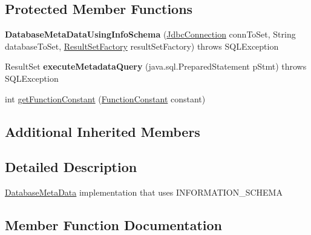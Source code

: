 \subsection*{Protected Member Functions}
\begin{DoxyCompactItemize}
\item 
\mbox{\label{classcom_1_1mysql_1_1cj_1_1jdbc_1_1_database_meta_data_using_info_schema_a0b688ba3bfda6e4e64a3c6374a977c52}} 
{\bfseries Database\+Meta\+Data\+Using\+Info\+Schema} (\mbox{\hyperlink{interfacecom_1_1mysql_1_1cj_1_1jdbc_1_1_jdbc_connection}{Jdbc\+Connection}} conn\+To\+Set, String database\+To\+Set, \mbox{\hyperlink{classcom_1_1mysql_1_1cj_1_1jdbc_1_1result_1_1_result_set_factory}{Result\+Set\+Factory}} result\+Set\+Factory)  throws S\+Q\+L\+Exception 
\item 
\mbox{\label{classcom_1_1mysql_1_1cj_1_1jdbc_1_1_database_meta_data_using_info_schema_aa18be67f7fbf345b6f5da88e68db44d2}} 
Result\+Set {\bfseries execute\+Metadata\+Query} (java.\+sql.\+Prepared\+Statement p\+Stmt)  throws S\+Q\+L\+Exception 
\item 
int \mbox{\hyperlink{classcom_1_1mysql_1_1cj_1_1jdbc_1_1_database_meta_data_using_info_schema_a3b2681238658a1ff285a88fef217016d}{get\+Function\+Constant}} (\mbox{\hyperlink{enumcom_1_1mysql_1_1cj_1_1jdbc_1_1_database_meta_data_using_info_schema_1_1_function_constant}{Function\+Constant}} constant)
\end{DoxyCompactItemize}
\subsection*{Additional Inherited Members}


\subsection{Detailed Description}
\mbox{\hyperlink{classcom_1_1mysql_1_1cj_1_1jdbc_1_1_database_meta_data}{Database\+Meta\+Data}} implementation that uses I\+N\+F\+O\+R\+M\+A\+T\+I\+O\+N\+\_\+\+S\+C\+H\+E\+MA 

\subsection{Member Function Documentation}
\mbox{\label{classcom_1_1mysql_1_1cj_1_1jdbc_1_1_database_meta_data_using_info_schema_a3b2681238658a1ff285a88fef217016d}} 
